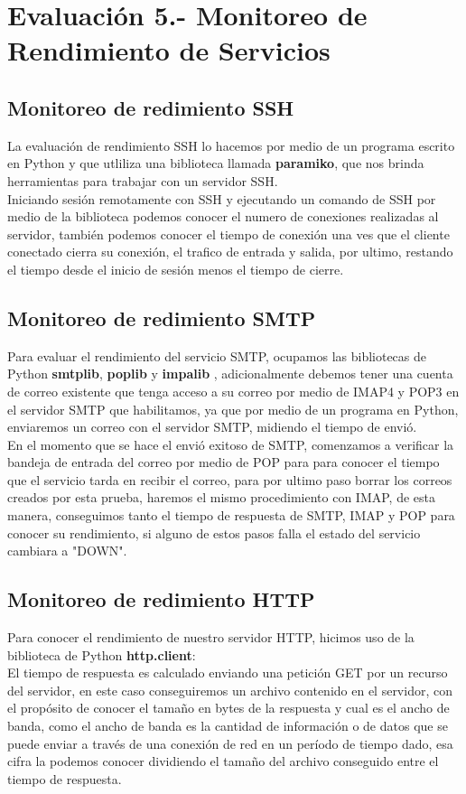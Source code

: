 \newpage
\noindent
\section{Evaluación 5.- Monitoreo de Rendimiento de Servicios}
\subsection{Monitoreo de redimiento SSH}
\noindent
La evaluación de rendimiento SSH lo hacemos por medio de un programa escrito en Python y que utliliza una biblioteca llamada \textbf{paramiko}, que nos brinda herramientas para trabajar con un servidor SSH. \\
Iniciando sesión remotamente con SSH y ejecutando un comando de SSH por medio de la biblioteca podemos conocer el numero de conexiones realizadas al servidor, también podemos conocer el tiempo de conexión una ves que el cliente conectado cierra su conexión, el trafico de entrada y salida, por ultimo, restando el tiempo desde el inicio de sesión menos el tiempo de cierre.

\subsection{Monitoreo de redimiento SMTP}
\noindent
Para evaluar el rendimiento del servicio SMTP, ocupamos las bibliotecas de Python \textbf{smtplib}, \textbf{poplib} y \textbf{impalib} , adicionalmente debemos tener una cuenta de correo existente que tenga acceso a su correo por medio de IMAP4 y POP3 en el servidor SMTP que habilitamos, ya que por medio de un programa en Python, enviaremos un correo con el servidor SMTP, midiendo el tiempo de envió.\\
En el momento que se hace el envió exitoso de SMTP, comenzamos a verificar la bandeja de entrada del correo por medio de POP para para conocer el tiempo que el servicio tarda en recibir el correo, para por ultimo paso borrar los correos creados por esta prueba, haremos el mismo procedimiento con IMAP, de esta manera, conseguimos tanto el tiempo de respuesta de SMTP, IMAP y POP para conocer su rendimiento, si alguno de estos pasos falla el estado del servicio cambiara a "DOWN".

\subsection{Monitoreo de redimiento HTTP}
\noindent
Para conocer el rendimiento de nuestro servidor HTTP, hicimos uso de la biblioteca de Python \textbf{http.client}:
\\
El tiempo de respuesta es calculado enviando una petición GET por un recurso del servidor, en este caso conseguiremos un archivo contenido en el servidor, con el propósito de conocer el tamaño en bytes de la respuesta y cual es el ancho de banda, como el ancho de banda es la cantidad de información o de datos que se puede enviar a través de una conexión de red en un período de tiempo dado, esa cifra la podemos conocer dividiendo el tamaño del archivo conseguido entre el tiempo de respuesta.
\newpage
\noindent

